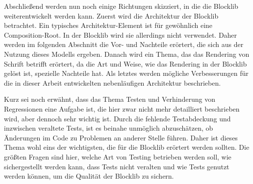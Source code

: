Abschließend werden nun noch einige Richtungen skizziert, in die die Blocklib weiterentwickelt werden kann. Zuerst wird die Architektur der Blocklib betrachtet. Ein typisches Architektur-Element ist für gewöhnlich eine Composition-Root. In der Blocklib wird sie allerdings nicht verwendet. Daher werden im folgenden Abschnitt die Vor- und Nachteile erörtert, die sich aus der Nutzung dieses Modells ergeben. Danach wird ein Thema, das das Rendering von Schrift betrifft erörtert, da die Art und Weise, wie das Rendering in der Blocklib gelöst ist, spezielle Nachteile hat. Als letztes werden mögliche Verbesserungen für die in dieser Arbeit entwickelten nebenläufigen Architektur beschrieben.

Kurz sei noch erwähnt, dass das Thema Testen und Verhinderung von Regressionen eine Aufgabe ist, die hier zwar nicht mehr detailliert beschrieben wird, aber dennoch sehr wichtig ist. Durch die fehlende Testabdeckung und inzwischen veraltete Tests, ist es beinahe unmöglich abzuschätzen, ob Änderungen im Code zu Problemen an anderer Stelle führen. Daher ist dieses Thema wohl eins der wichtigsten, die für die Blocklib erörtert werden sollten. Die größten Fragen sind hier, welche Art von Testing betrieben werden soll, wie sichergestellt werden kann, dass Tests nicht veralten und wie Tests genutzt werden können, um die Qualität der Blocklib zu sichern.